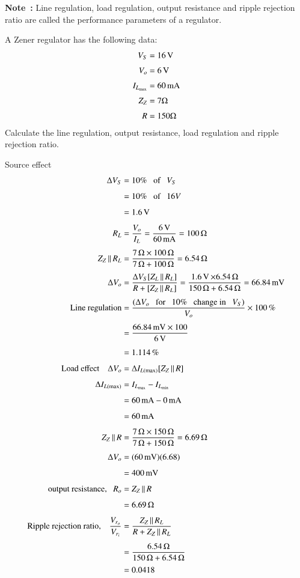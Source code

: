\eject

\noindent
{\bf Note~:} 
Line regulation, load regulation, output resistance and ripple rejection ratio are called the performance parameters of a regulator.

\begin{example}\label{exam2.35}
A Zener regulator has the following data:
\begin{align*}
V_{S} &= 16\text{\,V}\\[3pt]
V_{o} &= 6\text{\,V}\\[3pt]
I_{L_{\max}} &= 60\text{\,mA}\\[3pt]
Z_{Z} &= 7\Omega\\[3pt]
R &= 150\Omega
\end{align*}
Calculate the line regulation, output resistance, load regulation and ripple rejection ratio.
\end{example}

\begin{solution}
Source effect
\begin{align*}
\Delta V_{S} &= 10\%\text{~~ of~~ } V_{S}\\[4pt]
&= 10\%\text{~~ of~~ }16V\\[4pt]
&= 1.6\text{\,V}\\[4pt]
R_{L} &= \dfrac{V_{o}}{I_{L}}=\dfrac{6\text{\,V}}{60\text{\,mA}}=100\,\Omega\\[4pt]
Z_{Z}\,||\,R_{L} &= \dfrac{7\,\Omega\times 100\,\Omega}{7\,\Omega+100\,\Omega}=6.54\,\Omega\\[4pt]
\Delta V_{o} &= \dfrac{\Delta V_{S}[Z_{L}\,||\,R_{L}]}{R+[Z_{Z}\,||\,R_{L}]}=\dfrac{1.6\operatorname{\mathrm{V}}\times 6.54\,\Omega}{150\,\Omega+6.54\,\Omega}=66.84\text{\,mV}\\[4pt]
\text{Line regulation} &= \dfrac{(\Delta V_{o}\text{~~ for~~ }10\%\text{~~ change in~~ } V_{S})}{V_{o}}\times 100\,\%\\[4pt]
&= \dfrac{66.84\text{\,mV}\times 100}{6\operatorname{\mathrm{V}}}\\[4pt]
&= 1.114\,\%\\[4pt]
\text{Load effect}\quad \Delta V_{o} &= \Delta I_{L(\max)}[Z_{Z}\,||\,R]\\[4pt]
\Delta I_{L(\max)} &= I_{L_{\max}}-I_{L_{\min}}\\[4pt]
&= 60\text{\,mA}-0\text{\,mA}\\[4pt]
&= 60\text{\,mA}\\[4pt]
Z_{Z}\,||\,R &= \dfrac{7\,\Omega\times 150\,\Omega}{7\,\Omega+150\,\Omega}=6.69\,\Omega\\[4pt]
\Delta V_{o} &= (60\,\text{mV})(6.68)\\[4pt]
&= 400\text{\,mV}\\[4pt]
\text{output resistance,}~~~ R_{o} &= Z_{Z}\,||\,R\\[4pt]
&= 6.69\,\Omega\\[4pt]
\text{Ripple rejection ratio,}\quad \dfrac{V_{r_o}}{V_{r_i}} &= \dfrac{Z_{Z}\,||\,R_{L}}{R+Z_{Z}\,||\,R_{L}}\\[4pt]
&= \dfrac{6.54\,\Omega}{150\,\Omega+6.54\,\Omega}\\[2pt]
&= 0.0418
\end{align*}
\vskip -1cm
\end{solution}


